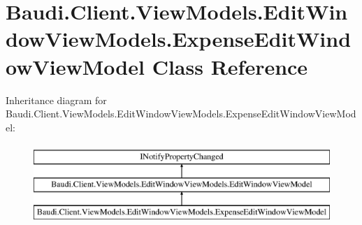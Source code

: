 \hypertarget{class_baudi_1_1_client_1_1_view_models_1_1_edit_window_view_models_1_1_expense_edit_window_view_model}{}\section{Baudi.\+Client.\+View\+Models.\+Edit\+Window\+View\+Models.\+Expense\+Edit\+Window\+View\+Model Class Reference}
\label{class_baudi_1_1_client_1_1_view_models_1_1_edit_window_view_models_1_1_expense_edit_window_view_model}
Inheritance diagram for Baudi.\+Client.\+View\+Models.\+Edit\+Window\+View\+Models.\+Expense\+Edit\+Window\+View\+Model\+:\begin{figure}[H]
\begin{center}
\leavevmode
\includegraphics[height=3.000000cm]{class_baudi_1_1_client_1_1_view_models_1_1_edit_window_view_models_1_1_expense_edit_window_view_model}
\end{center}
\end{figure}
